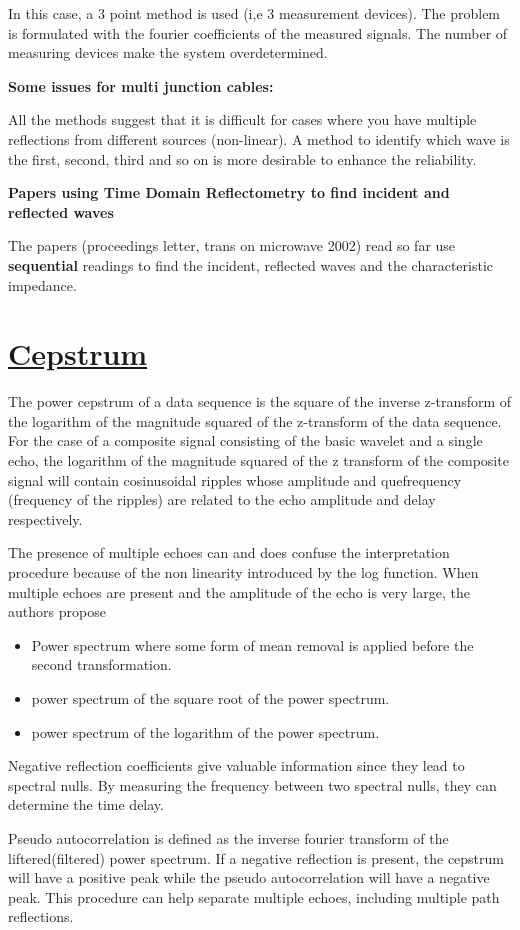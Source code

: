 \documentclass[12pt, a4paper]{report}
\newcommand{\record}[2]{\newpage\section*{\href{./library/#1.pdf}{#1}}\bibentry{#1}\fancyhf{}\lhead{#1}\rhead{#2}\par\bigbreak}
\begin{document}
In this case, a 3 point method is used (i,e 3 measurement devices). The problem is formulated with the fourier coefficients of the measured signals. The number of measuring devices make the system overdetermined.

\textbf{Some issues for multi junction cables:}

All the methods suggest that it is difficult for cases where you have multiple reflections from different sources (non-linear). A method to identify which wave is the first, second, third and so on is more desirable to enhance the reliability.

\textbf{Papers using Time Domain Reflectometry to find incident and reflected waves}

The papers (proceedings letter, trans on microwave 2002) read so far use \textbf{sequential} readings to find the incident, reflected waves and the characteristic impedance.
\record{Cepstrum}{}
The power cepstrum of a data sequence is the square of the inverse z-transform of the logarithm of the magnitude squared of the z-transform of the data sequence. 
For the case of a composite signal consisting of the basic wavelet and a single echo, the logarithm of the magnitude squared of the z transform of the composite signal will contain cosinusoidal ripples whose amplitude and quefrequency (frequency of the ripples) are related to the echo amplitude and delay respectively.

The presence of multiple echoes can and does confuse the interpretation procedure because of the non linearity introduced by the log function. When multiple echoes are present and the amplitude of the echo is very large, the authors propose
\begin{itemize}
	\item Power spectrum where some form of mean removal is applied before the second transformation.\item power spectrum of the square root of the power spectrum.
	\item power spectrum of the logarithm of the power spectrum.
\end{itemize}
Negative reflection coefficients give valuable information since they lead to spectral nulls. By measuring the frequency between two spectral nulls, they can determine the time delay.

Pseudo autocorrelation is defined as the inverse fourier transform of the liftered(filtered) power spectrum. If a negative reflection is present, the cepstrum will have a positive peak while the pseudo autocorrelation will have a negative peak.
This procedure can help separate multiple echoes, including multiple path reflections.
\end{document}
